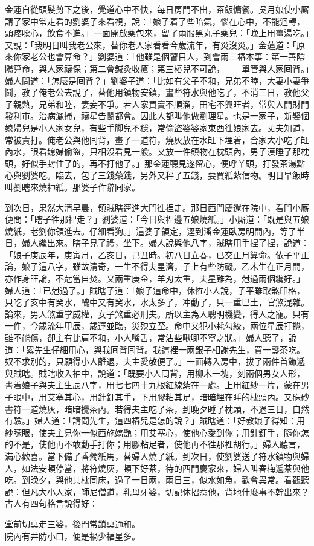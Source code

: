 金蓮自從頭髮剪下之後，覺道心中不快，每日房門不出，茶飯慵餐。吳月娘使小厮請了家中常走看的劉婆子來看視，說：「娘子着了些暗氣，惱在心中，不能迴轉，頭疼噁心，飲食不進。」一面開啟藥包來，留了兩服黑丸子藥兒：「晚上用薑湯吃。」又說：「我明日叫我老公來，替你老人家看看今歲流年，有災沒災。」金蓮道：「原來你家老公也會算命？」劉婆道：「他雖是個瞽目人，到會兩三樁本事：第一善陰陽算命，與人家禳保；第二會鍼灸收瘡；第三樁兒不可說，{}——單管與人家囘背。」婦人問道：「怎麼是囘背？」劉婆子道：「比如有父子不和，兄弟不睦，{}大妻小妻爭鬪，教了俺老公去說了，替他用鎮物安鎮，畫些符水與他吃了，不消三日，教他父子親熱，兄弟和睦，妻妾不爭。若人家買賣不順溜，田宅不興旺者，{}常與人開財門發利市。治病灑掃，禳星告鬪都會。因此人都叫他做劉理星。也是一家子，新娶個媳婦兒是小人家女兒，有些手脚兒不穩，常偷盜婆婆家東西徃娘家去。丈夫知道，常被責打。俺老公與他囘背，畫了一道符，燒灰放在水缸下埋着，合家大小吃了缸內水，眼看媳婦偷盜，只相沒看見一般。{}又放一件鎮物在枕頭內，男子漢睡了那枕頭，好似手封住了的，再不打他了。」那金蓮聽見遂留心，便呼丫頭，打發茶湯點心與劉婆吃。臨去，包了三錢藥錢，另外又秤了五錢，要買紙紮信物。明日早飯時叫劉瞎來燒神紙。那婆子作辭囘家。

到次日，果然大清早晨，領賊瞎逕進大門徃裡走。那日西門慶還在院中，看門小厮便問：「瞎子徃那裡走？」劉婆道：「今日與裡邊五娘燒紙。」小厮道：「既是與五娘燒紙，老劉你領進去。仔細看狗。」這婆子領定，逕到潘金蓮臥房明間內，等了半日，婦人纔出來。瞎子見了禮，坐下。婦人說與他八字，賊瞎用手捏了捏，說道：「娘子庚辰年，庚寅月，乙亥日，己丑時。初八日立春，已交正月算命。依子平正論，娘子這八字，雖故清奇，一生不得夫星濟，子上有些防礙。乙木生在正月間，亦作身旺論，不尅當自焚。又兩重庚金，羊刃太重，夫星難為，尅過兩個纔好。」婦人道：「已尅過了。」賊瞎子道：「娘子這命中，休恠小人說，子平雖取煞印格，只吃了亥中有癸水，醜中又有癸水，水太多了，冲動了，只一重巳土，官煞混雜。論來，男人煞重掌威權，女子煞重必刑夫。所以主為人聰明機變，得人之寵。只有一件，今歲流年甲辰，歲運並臨，災殃立至。命中又犯小耗勾絞，兩位星辰打攪，雖不能傷，卻主有比肩不和，小人嘴舌，常沾些啾唧不寧之狀。」婦人聽了，說道：「累先生仔細用心，與我囘背囘背。我這裡一兩銀子相謝先生，買一盞茶吃。奴不求別的，只願得小人離退，夫主愛敬便了。」一面轉入房中，拔了兩件首飾遞與賊瞎。賊瞎收入袖中，說道：「既要小人囘背，用柳木一塊，刻兩個男女人形，書着娘子與夫主生辰八字，用七七四十九根紅線紮在一處。上用紅紗一片，蒙在男子眼中，用艾塞其心，用針釘其手，下用膠粘其足，暗暗埋在睡的枕頭內。又硃砂書符一道燒灰，暗暗攪茶內。若得夫主吃了茶，到晚夕睡了枕頭，不過三日，自然有驗。」婦人道：「請問先生，這四樁兒是怎的說？」賊瞎道：「好教娘子得知：用紗矇眼，使夫主見你一似西施嬌艷；用艾塞心，使他心愛到你；用針釘手，隨你怎的不是，使他再不敢動手打你；用膠粘足者，使他再不徃那裡胡行。」{}婦人聽言，滿心歡喜。當下備了香燭紙馬，替婦人燒了紙。到次日，使劉婆送了符水鎮物與婦人，如法安頓停當，將符燒灰，頓下好茶，待的西門慶家來，婦人叫春梅遞茶與他吃。到晚夕，與他共枕同床，過了一日兩，兩日三，似水如魚，歡會異常。看觀聽說：但凡大小人家，師尼僧道，乳母牙婆，切記休招惹他，背地什麼事不幹出來？古人有四句格言說得好：

\begin{myquote}
堂前切莫走三婆，後門常鎖莫通和。\\院內有井防小口，便是禍少福星多。
\end{myquote}

